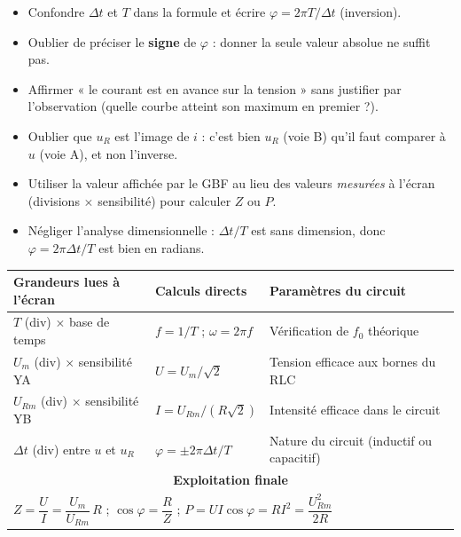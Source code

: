 \documentclass[11pt]{article}
\begin{document}
\begin{attention}
\begin{itemize}
    \item Confondre $\Delta t$ et $T$ dans la formule et écrire $\varphi = 2\pi T/\Delta t$ (inversion).
    \item Oublier de préciser le \textbf{signe} de $\varphi$ : donner la seule valeur absolue ne suffit pas.
    \item Affirmer « le courant est en avance sur la tension » sans justifier par l'observation (quelle courbe atteint son maximum en premier ?).
    \item Oublier que $u_R$ est l'image de $i$ : c'est bien $u_R$ (voie B) qu'il faut comparer à $u$ (voie A), et non l'inverse.
    \item Utiliser la valeur affichée par le GBF au lieu des valeurs \emph{mesurées} à l'écran (divisions $\times$ sensibilité) pour calculer $Z$ ou $P$.
    \item Négliger l'analyse dimensionnelle : $\Delta t/T$ est sans dimension, donc $\varphi = 2\pi\Delta t/T$ est bien en radians.
\end{itemize}
\end{attention}

\begin{aretenir}
\begin{center}
\begin{tabularx}{\linewidth}{|l|X|X|}\hline
\rowcolor{popblueL}
\textbf{Grandeurs lues à l'écran} & \textbf{Calculs directs} & \textbf{Paramètres du circuit} \\ \hline
$T$ (div) $\times$ base de temps & $f = 1/T$ ; $\omega = 2\pi f$ & Vérification de $f_0$ théorique \\ \hline
$U_m$ (div) $\times$ sensibilité YA & $U = U_m/\sqrt{2}$ & Tension efficace aux bornes du RLC \\ \hline
$U_{Rm}$ (div) $\times$ sensibilité YB & $I = U_{Rm}/(R\sqrt{2})$ & Intensité efficace dans le circuit \\ \hline
$\Delta t$ (div) entre $u$ et $u_R$ & $\varphi = \pm 2\pi \Delta t / T$ & Nature du circuit (inductif ou capacitif) \\ \hline
\multicolumn{3}{|c|}{\textbf{Exploitation finale}} \\ \hline
\multicolumn{3}{|X|}{$Z = \dfrac{U}{I} = \dfrac{U_m}{U_{Rm}}\,R$ \quad ; \quad $\cos\varphi = \dfrac{R}{Z}$ \quad ; \quad $P = U I \cos\varphi = R I^2 = \dfrac{U_{Rm}^2}{2R}$} \\ \hline
\end{tabularx}
\end{center}
\end{aretenir}
\end{document}
